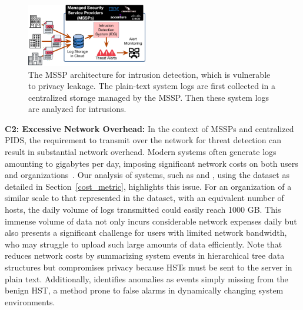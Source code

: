 \begin{figure}[t!]
    \centering
    \includegraphics[width=0.47\textwidth]{fig/mssp.pdf}
    \caption{The MSSP architecture for intrusion detection, which is vulnerable to privacy leakage. The plain-text system logs are first collected in a centralized storage managed by the MSSP. Then these system logs are analyzed for intrusions.}
    \label{mssp}
    \vspace{-4ex}
  \end{figure}
    
\smallskip
\noindent
\textbf{C2: Excessive Network Overhead:} In the context of MSSPs and centralized PIDS, the requirement to transmit \logs over the network for threat detection can result in substantial network overhead. Modern systems often generate logs amounting to gigabytes per day, imposing significant network costs on both users and organizations~\cite{inam2023sok,hossain+depend}. Our analysis of systems, such as \flash and \kairos, using the \optc dataset as detailed in Section~\ref{cost_metric}, highlights this issue. For an organization of a similar scale to that represented in the \optc dataset, with an equivalent number of hosts, the daily volume of logs transmitted could easily reach 1000 GB. This immense volume of data not only incurs considerable network expenses daily but also presents a significant challenge for users with limited network bandwidth, who may struggle to upload such large amounts of data efficiently. Note that \disdet reduces network costs by summarizing system events in hierarchical tree data structures but compromises privacy because HSTs must be sent to the server in plain text. Additionally, \disdet identifies anomalies as events simply missing from the benign HST, a method prone to false alarms in dynamically changing system environments.


